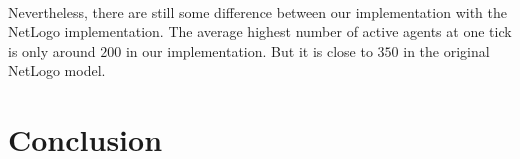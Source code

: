 \documentclass[11pt]{article}
\begin{document}
      \paragraph{}
      Nevertheless, there are still some difference between our implementation with
      the NetLogo implementation. The average highest number of active agents at
      one tick is only around $200$ in our implementation. But it is close to $350$
      in the original NetLogo model. 

    \section{Conclusion}
    
\end{document}
